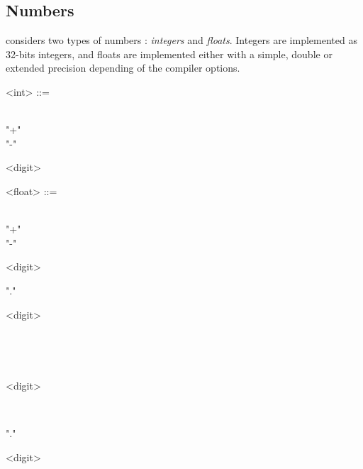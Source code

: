 \documentclass[a4paper]{book}
\begin{document}
\subsection{Numbers}

\faust considers two types of numbers : \textit{integers} and \textit{floats}. Integers are implemented as 32-bits integers, and floats are implemented either with a simple, double or extended precision depending of the compiler options.

\begin{grammar}
  <int> ::= 
  \begin{syntdiag}
    \begin{stack}
      \\ "+" \\ "-"
    \end{stack}
    \begin{rep}
      <digit>
    \end{rep}
  \end{syntdiag}
\end{grammar}

\begin{grammar}
  <float> ::= 
  \begin{syntdiag}
    \begin{stack}
      \\ "+" \\ "-"
    \end{stack}
    \begin{stack}
      \begin{rep}<digit>\end{rep} "." \begin{stack} \begin{rep}<digit>\end{rep} \\ \end{stack} \\
      \begin{stack} \begin{rep}<digit>\end{rep} \\ \end{stack} "." \begin{rep}<digit>\end{rep}
    \end{stack}
  \end{syntdiag}
\end{grammar}
\end{document}
